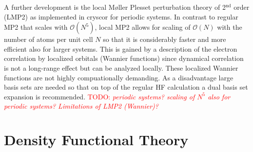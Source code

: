 \documentclass[11pt,DIV=13,BCOR=5mm,a4paper,headinclude]{scrbook}
\newcommand\todo[1]{\textcolor{red}{TODO: \textit{{#1}}}}
\begin{document}
A further development is the local M\o{}ller Plesset perturbation theory\cite{usvyat2015,usvyatbook,Maschio2007} of 2$^{\textrm{nd}}$ order (LMP2) as implemented in cryscor\cite{cryscor} for periodic systems.
In contrast to regular MP2 that scales with $\mathcal{O}(N^5)$, local MP2 allows for scaling of $\mathcal{O}(N)$ with the number of atoms per unit cell $N$ so that it is considerably faster and more efficient also for larger systems.
This is gained by a description of the electron correlation by localized orbitals (Wannier functions) since dynamical correlation is not a long-range effect but can be analyzed locally.
These localized Wannier functions are not highly compuationally demanding.
As a disadvantage large basis sets are needed so that on top of the regular HF calculation a dual basis set expansion is recommended\cite{Usvyat2010}.
\todo{periodic systems? scaling of $N^5$ also for periodic systems? Limitations of LMP2 (Wannier)?}

\section{Density Functional Theory}
\end{document}
